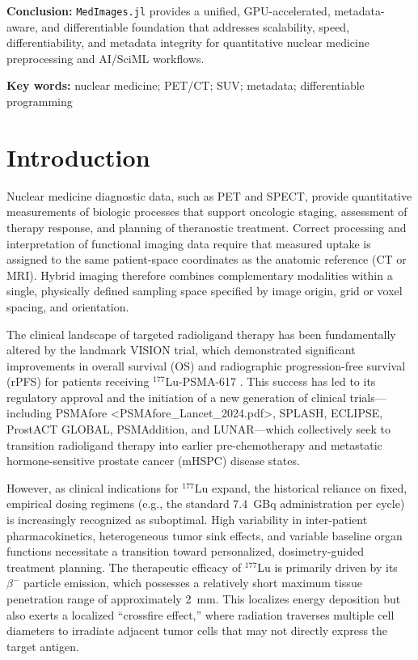\documentclass[a4paper,10pt]{elsarticle}
\begin{document}
\textbf{Conclusion:} \texttt{MedImages.jl} provides a unified, GPU-accelerated, metadata-aware, and differentiable foundation that addresses scalability, speed, differentiability, and metadata integrity for quantitative nuclear medicine preprocessing and AI/SciML workflows.

\textbf{Key words:} nuclear medicine; PET/CT; SUV; metadata; differentiable programming

\section{Introduction}

Nuclear medicine diagnostic data, such as PET and SPECT, provide quantitative measurements of biologic processes that support oncologic staging, assessment of therapy response, and planning of theranostic treatment. Correct processing and interpretation of functional imaging data require that measured uptake is assigned to the same patient-space coordinates as the anatomic reference (CT or MRI). Hybrid imaging therefore combines complementary modalities within a single, physically defined sampling space specified by image origin, grid or voxel spacing, and orientation. 

The clinical landscape of targeted radioligand therapy has been fundamentally altered by the landmark VISION trial, which demonstrated significant improvements in overall survival (OS) and radiographic progression-free survival (rPFS) for patients receiving $^{177}$Lu-PSMA-617  \cite{SartorBono2021}. This success has led to its regulatory approval and the initiation of a new generation of clinical trials—including PSMAfore <PSMAfore_Lancet_2024.pdf>, SPLASH, ECLIPSE, ProstACT GLOBAL, PSMAddition, and LUNAR—which collectively seek to transition radioligand therapy into earlier pre-chemotherapy and metastatic hormone-sensitive prostate cancer (mHSPC) disease states.

However, as clinical indications for $^{177}$Lu expand, the historical reliance on fixed, empirical dosing regimens (e.g., the standard 7.4~GBq administration per cycle) is increasingly recognized as suboptimal. High variability in inter-patient pharmacokinetics, heterogeneous tumor sink effects, and variable baseline organ functions necessitate a transition toward personalized, dosimetry-guided treatment planning. The therapeutic efficacy of $^{177}$Lu is primarily driven by its $\beta^-$ particle emission, which possesses a relatively short maximum tissue penetration range of approximately 2~mm. This localizes energy deposition but also exerts a localized ``crossfire effect,'' where radiation traverses multiple cell diameters to irradiate adjacent tumor cells that may not directly express the target antigen.
\end{document}
